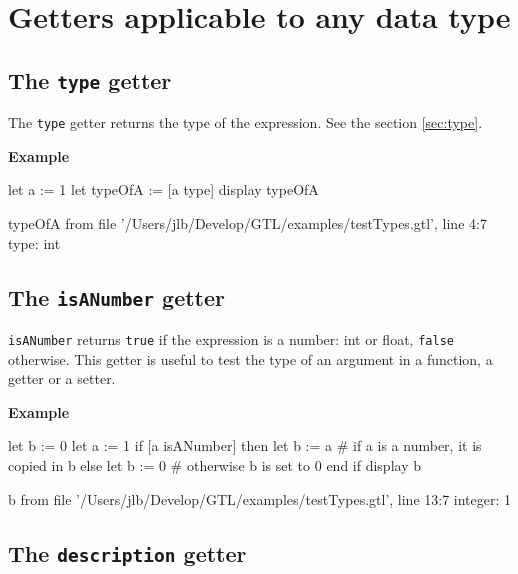 \documentclass[10pt,openright,twosides,final]{memoir}
\newcommand{\gtltype}[1]{{\small\ttfamily #1}}
\newcommand{\gtlinline}[1]{\colorbox{light-blue}{\lstinline[language=gtl]{#1}}}
\newcommand{\example}{\vspace{.75em}\noindent\textbf{Example}\vspace{0em}}
\begin{document}
\section{Getters applicable to any data type}

\subsection{The \texttt{type} getter} 
\label{universalGetter:type}

The \gtlinline{type} getter returns the type of the expression. See the section \ref{sec:type}.

\example

\begin{gtl}
let a := 1
let typeOfA := [a type]
display typeOfA
\end{gtl}

\begin{console}
typeOfA from file '/Users/jlb/Develop/GTL/examples/testTypes.gtl', line 4:7
    type: int
\end{console}

\subsection{The \texttt{isANumber} getter} 
\label{sec:isANumber}
 
\gtlinline{isANumber} returns \gtlinline{true} if the expression is a number: \gtltype{int} or \gtltype{float}, \gtlinline{false} otherwise. This getter is useful to test the type of an argument in a function, a getter or a setter.

\example

\begin{gtl}
let b := 0
let a := 1
if [a isANumber] then
  let b := a # if a is a number, it is copied in b
else
  let b := 0 # otherwise b is set to 0
end if
display b
\end{gtl}

\begin{console}
b from file '/Users/jlb/Develop/GTL/examples/testTypes.gtl', line 13:7
    integer: 1
\end{console}


\subsection{The \texttt{description} getter} 
\label{sec:description}
\end{document}
